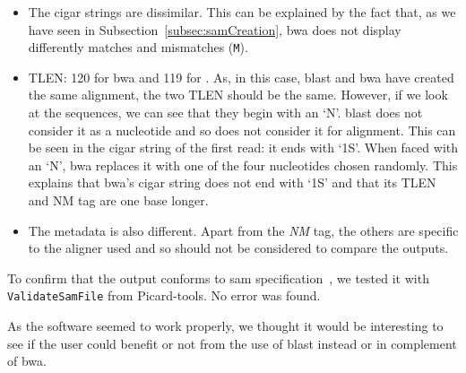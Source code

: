 \begin{itemize}
    \item The \gls{cigar} strings are dissimilar.
    This can be explained by the fact that, as we have seen in Subsection~\ref{subsec:samCreation}, \gls{bwa} does not display differently matches and mismatches (\texttt{M}).
    \item TLEN\@: 120 for \gls{bwa} and 119 for \blastobam{}. As, in this case, \gls{blast} and \gls{bwa} have created the same alignment, the two TLEN should be the same.
    However, if we look at the sequences, we can see that they begin with an `N'. \gls{blast} does not consider it as a nucleotide and so does not consider it for alignment.
    This can be seen in the \gls{cigar} string of the first read: it ends with `1S'. When faced with an `N', \gls{bwa} replaces it with one of the four nucleotides chosen randomly.
    This explains that \gls{bwa}'s \gls{cigar} string does not end with `1S' and that its TLEN and NM tag are one base longer.
    \item The metadata is also different. Apart from the \emph{NM} tag, the others are specific to the aligner used and so should not be considered to compare the outputs.
\end{itemize}

To confirm that the output conforms to \gls{sam} specification~\cite{samspec}, we tested it with \texttt{ValidateSamFile} from Picard-tools. No error was found. 

As the software seemed to work properly, we thought it would be interesting to see if the user could benefit or not from the use of \gls{blast} instead or in complement of \gls{bwa}. 

